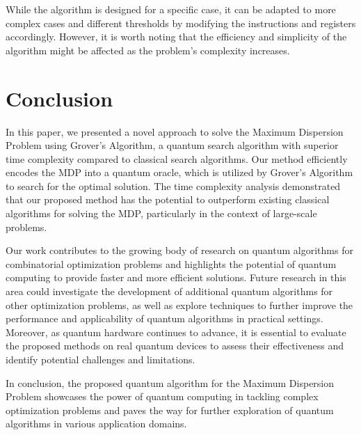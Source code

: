 While the algorithm is designed for a specific case, it can be adapted to more complex cases and different thresholds by modifying the instructions and registers accordingly. However, it is worth noting that the efficiency and simplicity of the algorithm might be affected as the problem's complexity increases.

\section{Conclusion}
\label{sec:conclusion}

In this paper, we presented a novel approach to solve the Maximum Dispersion Problem using Grover's Algorithm, a quantum search algorithm with superior time complexity compared to classical search algorithms. Our method efficiently encodes the MDP into a quantum oracle, which is utilized by Grover's Algorithm to search for the optimal solution. The time complexity analysis demonstrated that our proposed method has the potential to outperform existing classical algorithms for solving the MDP, particularly in the context of large-scale problems.

Our work contributes to the growing body of research on quantum algorithms for combinatorial optimization problems and highlights the potential of quantum computing to provide faster and more efficient solutions. Future research in this area could investigate the development of additional quantum algorithms for other optimization problems, as well as explore techniques to further improve the performance and applicability of quantum algorithms in practical settings. Moreover, as quantum hardware continues to advance, it is essential to evaluate the proposed methods on real quantum devices to assess their effectiveness and identify potential challenges and limitations.

In conclusion, the proposed quantum algorithm for the Maximum Dispersion Problem showcases the power of quantum computing in tackling complex optimization problems and paves the way for further exploration of quantum algorithms in various application domains.

